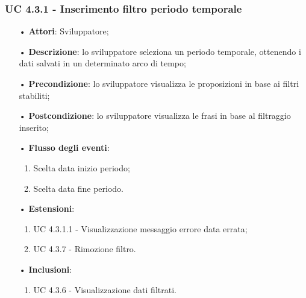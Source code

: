 \subsubsection{UC 4.3.1 - Inserimento filtro periodo temporale}
\begin{itemize}
	\item[•]\textbf{Attori}: Sviluppatore;
	\item[•]\textbf{Descrizione}: lo sviluppatore seleziona un periodo temporale, ottenendo i dati salvati in un determinato arco di tempo;
	\item[•]\textbf{Precondizione}: lo sviluppatore visualizza le proposizioni in base ai filtri stabiliti;
	\item[•]\textbf{Postcondizione}: lo sviluppatore visualizza le frasi in base al filtraggio inserito;
	\item[•]\textbf{Flusso degli eventi}: 
	\begin{enumerate}
		\item Scelta data inizio periodo;
		\item Scelta data fine periodo.
	\end{enumerate}
	\item[•]\textbf{Estensioni}: 
	\begin{enumerate}
		\item UC 4.3.1.1 - Visualizzazione messaggio errore data errata;
		\item UC 4.3.7 - Rimozione filtro.
	\end{enumerate}
	\item[•]\textbf{Inclusioni}:
	\begin{enumerate}
		\item UC 4.3.6 - Visualizzazione dati filtrati.
	\end{enumerate}
\end{itemize}

